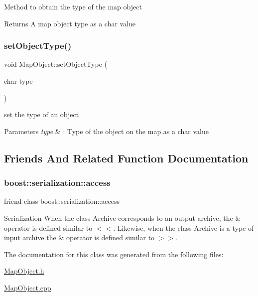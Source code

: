 Method to obtain the type of the map object \begin{DoxyReturn}{Returns}
A map object type as a char value 
\end{DoxyReturn}
\hypertarget{class_map_object_a8a0fb292fa5e3262f304baeaa5db39fc}{}\label{class_map_object_a8a0fb292fa5e3262f304baeaa5db39fc} 
\subsubsection{\texorpdfstring{set\+Object\+Type()}{setObjectType()}}
{\footnotesize\ttfamily void Map\+Object\+::set\+Object\+Type (\begin{DoxyParamCaption}\item[{char}]{type }\end{DoxyParamCaption})}

set the type of an object 
\begin{DoxyParams}{Parameters}
{\em type} & \+: Type of the object on the map as a char value \\
\hline
\end{DoxyParams}


\subsection{Friends And Related Function Documentation}
\hypertarget{class_map_object_ac98d07dd8f7b70e16ccb9a01abf56b9c}{}\label{class_map_object_ac98d07dd8f7b70e16ccb9a01abf56b9c} 
\subsubsection{\texorpdfstring{boost\+::serialization\+::access}{boost::serialization::access}}
{\footnotesize\ttfamily friend class boost\+::serialization\+::access\hspace{0.3cm}{\ttfamily [friend]}}

Serialization When the class Archive corresponds to an output archive, the \& operator is defined similar to $<$$<$. Likewise, when the class Archive is a type of input archive the \& operator is defined similar to $>$$>$. 

The documentation for this class was generated from the following files\+:\begin{DoxyCompactItemize}
\item 
\hyperlink{_map_object_8h}{Map\+Object.\+h}\item 
\hyperlink{_map_object_8cpp}{Map\+Object.\+cpp}\end{DoxyCompactItemize}
